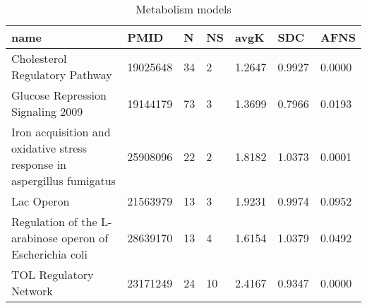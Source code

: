 \begin{table}
\caption{Metabolism models}
\label{tab:Metabolism}
\begin{tabular}{|p{180pt}||p{40pt}|p{25pt}|p{25pt}|p{40pt}|p{25pt}|p{25pt}|}
\toprule
name & PMID & N & NS & avgK & SDC & AFNS \\
\midrule
Cholesterol Regulatory Pathway & 19025648 & 34 & 2 & 1.2647 & 0.9927 & 0.0000 \\
Glucose Repression Signaling 2009 & 19144179 & 73 & 3 & 1.3699 & 0.7966 & 0.0193 \\
Iron acquisition and oxidative stress response in aspergillus fumigatus & 25908096 & 22 & 2 & 1.8182 & 1.0373 & 0.0001 \\
Lac Operon & 21563979 & 13 & 3 & 1.9231 & 0.9974 & 0.0952 \\
Regulation of the L-arabinose operon of Escherichia coli & 28639170 & 13 & 4 & 1.6154 & 1.0379 & 0.0492 \\
TOL Regulatory Network & 23171249 & 24 & 10 & 2.4167 & 0.9347 & 0.0000 \\
\bottomrule
\end{tabular}
\end{table}
